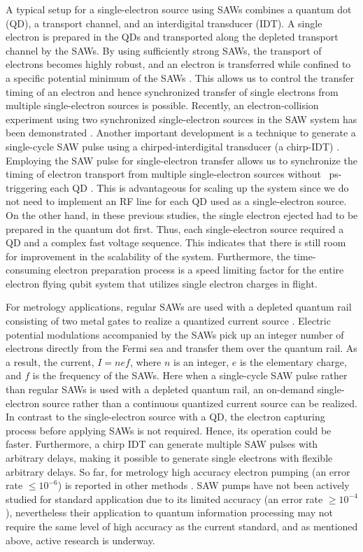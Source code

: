 \documentclass{article}
\begin{document}
A typical setup for a single-electron source using SAWs combines a quantum dot (QD), a transport channel, and an interdigital transducer (IDT). A single electron is prepared in the QDs and transported along the depleted transport channel by the SAWs. By using sufficiently strong SAWs, the transport of electrons becomes highly robust, and an electron is transferred while confined to a specific potential minimum of the SAWs \cite{HE_APL2021}. This allows us to control the transfer timing of an electron and hence synchronized transfer of single electrons from multiple single-electron sources is possible. Recently, an electron-collision experiment using two synchronized single-electron sources in the SAW system has been demonstrated \cite{Wang2023}. Another important development is a technique to generate a single-cycle SAW pulse using a chirped-interdigital transducer (a chirp-IDT) \cite{JW_PRX2022}. Employing the SAW pulse for single-electron transfer allows us to synchronize the timing of electron transport from multiple single-electron sources without \SI{}{ps}-triggering each QD \cite{Takada2019}. This is advantageous for scaling up the system since we do not need to implement an RF line for each QD used as a single-electron source. On the other hand, in these previous studies, the single electron ejected had to be prepared in the quantum dot first. Thus, each single-electron source required a QD and a complex fast voltage sequence. This indicates that there is still room for improvement in the scalability of the system. Furthermore, the time-consuming electron preparation process is a speed limiting factor for the entire electron flying qubit system that utilizes single electron charges in flight.

For metrology applications, regular SAWs are used with a depleted quantum rail consisting of two metal gates to realize a quantized current source \cite{Shilton1996,Talyanskii1997,Cunningham1999,Cunningham2000,Ebbecke2002,Kataoka2006}. Electric potential modulations accompanied by the SAWs pick up an integer number of electrons directly from the Fermi sea and transfer them over the quantum rail. As a result, the current, $I = nef$, where $n$ is an integer, $e$ is the elementary charge, and $f$ is the frequency of the SAWs. Here when a single-cycle SAW pulse rather than regular SAWs is used with a depleted quantum rail, an on-demand single-electron source rather than a continuous quantized current source can be realized. In contrast to the single-electron source with a QD, the electron capturing process before applying SAWs is not required. Hence, its operation could be faster. Furthermore, a chirp IDT can generate multiple SAW pulses with arbitrary delays, making it possible to generate single electrons with flexible arbitrary delays. So far, for metrology high accuracy electron pumping (an error rate $\leq 10^{-6}$) is reported in other methods \cite{Keller1996, Stein2015, Yamahata2016, Blumenthal2007}. SAW pumps have not been actively studied for standard application due to its limited accuracy (an error rate $\geq 10^{-4}$), nevertheless their application to quantum information processing may not require the same level of high accuracy as the current standard, and as mentioned above, active research is underway.
\end{document}
